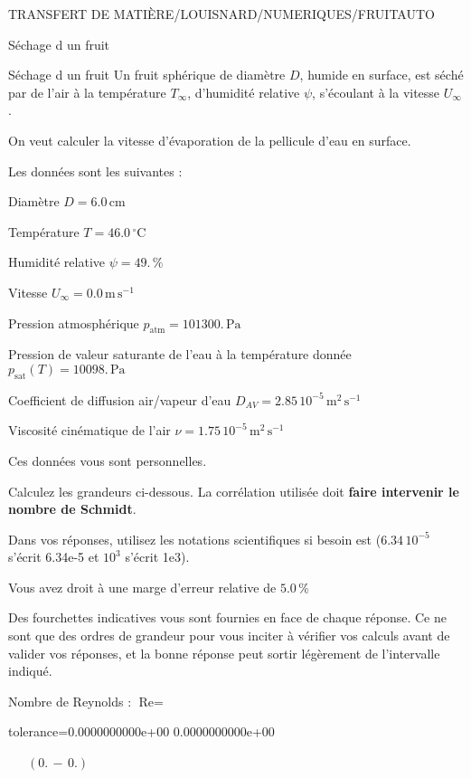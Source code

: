\documentclass[12pt]{article}
\begin{document}
\begin{quiz}{TRANSFERT DE MATIÈRE/LOUISNARD/NUMERIQUES/FRUITAUTO}
\begin{cloze}{Séchage d un fruit}
\end{cloze} 


 \begin{cloze}{Séchage d un fruit} 
Un fruit sphérique de diamètre $D$, humide en surface, est séché par de l'air à la température $T_\infty$, d'humidité relative $\psi$, s'écoulant à la vitesse $U_\infty$.

On veut calculer la vitesse d'évaporation de la pellicule d'eau en surface.

 

Les données sont les suivantes :

 

Diamètre $D = 6.0\,  \mathrm{cm} $

Température $T = 46.0\,  \mathrm{^\circ\mathrm{C}} $

Humidité relative $\psi = 49.\, \% $

Vitesse $U_\infty = 0.0\,  \mathrm{m}\,  \mathrm{s}^{-1} $

Pression atmosphérique $p_{\text{atm}} = 101300.\,  \mathrm{Pa} $

Pression de valeur saturante de l’eau à la température donnée $p_{\text{sat}}(T) = 10098.\,  \mathrm{Pa} $

Coefficient de diffusion air/vapeur d’eau $D_{AV} =  2.85 \, 10^{-5} \,  \mathrm{m}^{2}\,  \mathrm{s}^{-1} $

Viscosité cinématique de l’air $\nu =  1.75 \, 10^{-5} \,  \mathrm{m}^{2}\,  \mathrm{s}^{-1} $

Ces données vous sont personnelles.

 

Calculez les grandeurs ci-dessous. La corrélation utilisée doit \textbf{faire intervenir le nombre de Schmidt}.

Dans vos réponses, utilisez les notations scientifiques si besoin est ($6.34\, 10^{-5}$ s'écrit 6.34e-5 et $10^{3}$ s'écrit 1e3).

Vous avez droit à une marge d'erreur relative de $5.0\, \% $

Des fourchettes indicatives vous sont fournies en face de chaque réponse. Ce ne sont que des ordres de grandeur pour vous inciter à vérifier vos calculs avant de valider vos réponses, et la bonne réponse peut sortir légèrement de l'intervalle indiqué.

 

Nombre de Reynolds : $\text{Re} =  $
\begin{numerical}[points=1] 
\item[tolerance={0.0000000000e+00}] 0.0000000000e+00 
\end{numerical} 
 $\,$ 
 $ \quad (0. \, - \, 0.) $ 


\end{cloze}
\end{quiz}
\end{document}
